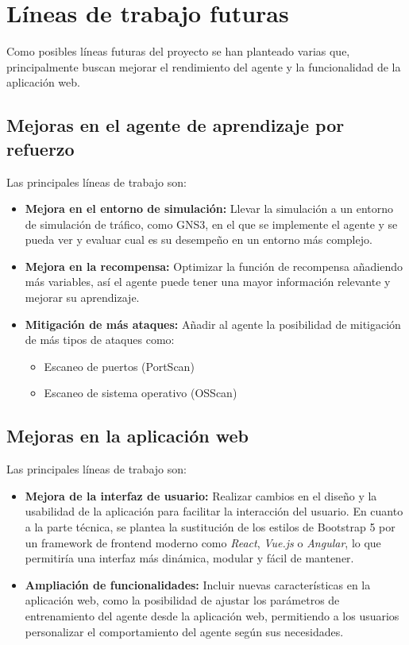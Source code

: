 \section{Líneas de trabajo futuras}
Como posibles líneas futuras del proyecto se han planteado varias que, principalmente buscan mejorar el rendimiento del agente y la funcionalidad de la aplicación web. 

\subsection{Mejoras en el agente de aprendizaje por refuerzo}
Las principales líneas de trabajo son:
\begin{itemize}
    \item \textbf{Mejora en el entorno de simulación:} Llevar la simulación a un entorno de simulación de tráfico, como GNS3, en el que se implemente el agente y se pueda ver y evaluar cual es su desempeño en un entorno más complejo.
    \item \textbf{Mejora en la recompensa:} Optimizar la función de recompensa añadiendo más variables, así el agente puede tener una mayor información relevante y mejorar su aprendizaje.
    \item \textbf{Mitigación de más ataques:} Añadir al agente la posibilidad de mitigación de más tipos de ataques como:
    \begin{itemize}
        \item Escaneo de puertos (PortScan)
        \item Escaneo de sistema operativo (OSScan)
    \end{itemize}
\end{itemize}

\subsection{Mejoras en la aplicación web}
Las principales líneas de trabajo son:
\begin{itemize}
    \item \textbf{Mejora de la interfaz de usuario:} Realizar cambios en el diseño y la usabilidad de la aplicación para facilitar la interacción del usuario. En cuanto a la parte técnica, se plantea la sustitución de los estilos de Bootstrap 5 por un framework de frontend moderno como \textit{React}, \textit{Vue.js} o \textit{Angular}, lo que permitiría una interfaz más dinámica, modular y fácil de mantener.
    \item \textbf{Ampliación de funcionalidades:} Incluir nuevas características en la aplicación web, como la posibilidad de ajustar los parámetros de entrenamiento del agente desde la aplicación web, permitiendo a los usuarios personalizar el comportamiento del agente según sus necesidades.
\end{itemize}
